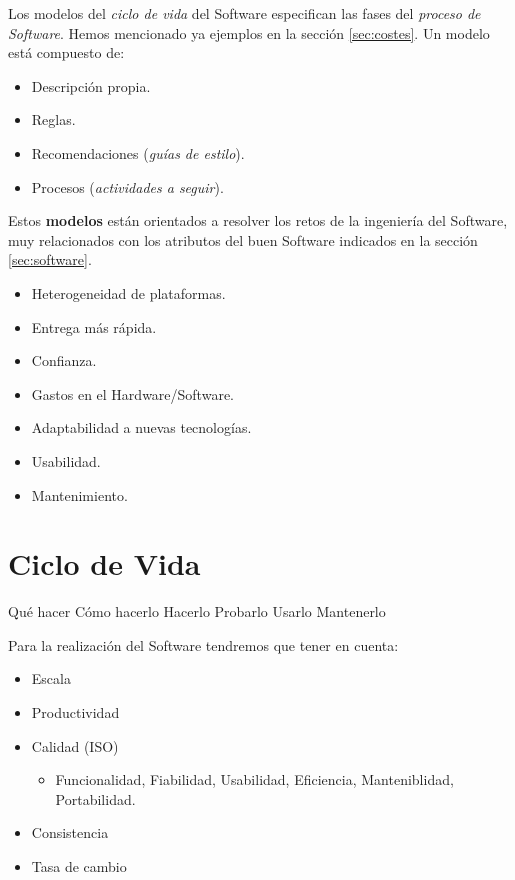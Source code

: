 Los modelos del \emph{ciclo de vida} del Software especifican las
fases del \emph{proceso de Software}. Hemos mencionado ya ejemplos en
la sección \ref{sec:costes}. Un modelo está compuesto de:
\begin{itemize}[noitemsep]
\item Descripción propia.
\item Reglas.
\item Recomendaciones (\emph{guías de estilo}).
\item Procesos (\emph{actividades a seguir}).
\end{itemize}

Estos \textbf{modelos} están orientados a resolver los retos de la ingeniería
del Software, muy relacionados con los atributos
del buen Software indicados en la sección \ref{sec:software}.

\begin{itemize}[noitemsep]
\item Heterogeneidad de plataformas.
\item Entrega más rápida.
\item Confianza.
\item Gastos en el Hardware/Software.
\item Adaptabilidad a nuevas tecnologías.
\item Usabilidad.
\item Mantenimiento.
\end{itemize}

\section{Ciclo de Vida}
\label{sec:cv}

\begin{center}
Qué hacer \textrightarrow Cómo hacerlo \textrightarrow Hacerlo
\textrightarrow Probarlo \textrightarrow Usarlo \textrightarrow
Mantenerlo
\end{center}

Para la realización del Software tendremos que tener en cuenta:
\begin{itemize}[noitemsep]
\item Escala
\item Productividad
\item Calidad (ISO)
  \begin{itemize}
  \item Funcionalidad, Fiabilidad, Usabilidad, Eficiencia,
    Manteniblidad, Portabilidad.
  \end{itemize}
\item Consistencia
\item Tasa de cambio
\end{itemize}

